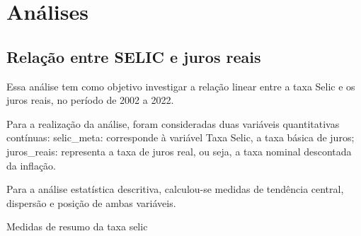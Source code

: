 \documentclass[
  portuguese,
]{estat/estat}
\let\oldsection\section
\renewcommand\section{\clearpage\oldsection}
\begin{document}
\section{Análises}\label{anuxe1lises}

\subsection{Relação entre SELIC e juros
reais}\label{relauxe7uxe3o-entre-selic-e-juros-reais}

Essa análise tem como objetivo investigar a relação linear entre a taxa
Selic e os juros reais, no período de 2002 a 2022.

Para a realização da análise, foram consideradas duas variáveis
quantitativas contínuas: selic\_meta: corresponde à variável Taxa Selic,
a taxa básica de juros; juros\_reais: representa a taxa de juros real,
ou seja, a taxa nominal descontada da inflação.

Para a análise estatística descritiva, calculou-se medidas de tendência
central, dispersão e posição de ambas variáveis.

\begin{quadro}[H]

\caption{\label{quad-quadro_selic}Medidas de resumo da taxa selic}


\end{quadro}%
\end{document}
